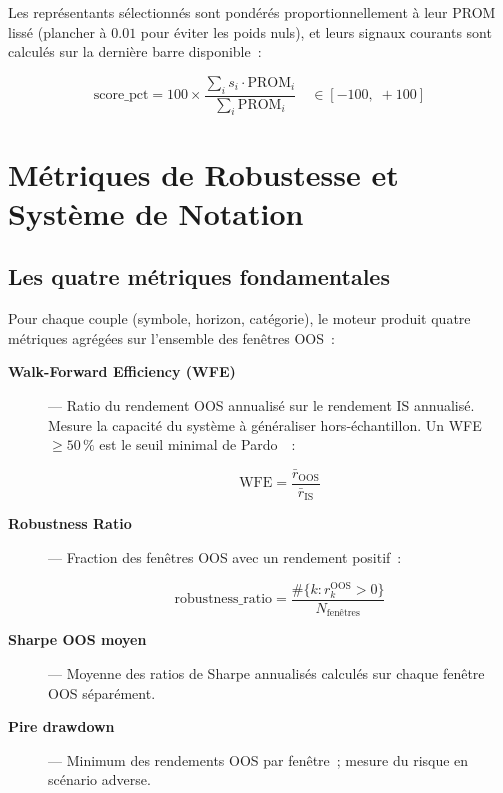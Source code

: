 Les représentants sélectionnés sont pondérés proportionnellement à leur PROM lissé
(plancher à $0.01$ pour éviter les poids nuls), et leurs signaux courants sont
calculés sur la dernière barre disponible~:

\begin{equation}
\text{score\_pct} = 100 \times \frac{\displaystyle\sum_{i} s_i \cdot \text{PROM}_i}
{\displaystyle\sum_{i} \text{PROM}_i}
\quad \in [-100,\; +100]
\label{eq:wfo_score}
\end{equation}

\section{Métriques de Robustesse et Système de Notation}
\label{sec:wfo_scoring}

\subsection{Les quatre métriques fondamentales}

Pour chaque couple (symbole, horizon, catégorie), le moteur produit quatre métriques
agrégées sur l'ensemble des fenêtres OOS~:

\begin{description}
    \item[\textbf{Walk-Forward Efficiency (WFE)}] — Ratio du rendement OOS annualisé
    sur le rendement IS annualisé. Mesure la capacité du système à généraliser
    hors-échantillon. Un WFE $\geq 50\,\%$ est le seuil minimal de Pardo~\cite{pardo2008}~:

    \begin{equation}
    \text{WFE} = \frac{\bar{r}_{\text{OOS}}}{\bar{r}_{\text{IS}}}
    \label{eq:wfe}
    \end{equation}

    \item[\textbf{Robustness Ratio}] — Fraction des fenêtres OOS avec un rendement
    positif~:

    \begin{equation}
    \text{robustness\_ratio} = \frac{\#\{k : r_k^{\text{OOS}} > 0\}}
    {N_{\text{fenêtres}}}
    \label{eq:robustness_ratio}
    \end{equation}

    \item[\textbf{Sharpe OOS moyen}] — Moyenne des ratios de Sharpe annualisés
    calculés sur chaque fenêtre OOS séparément.

    \item[\textbf{Pire drawdown}] — Minimum des rendements OOS par fenêtre~;
    mesure du risque en scénario adverse.
\end{description}

